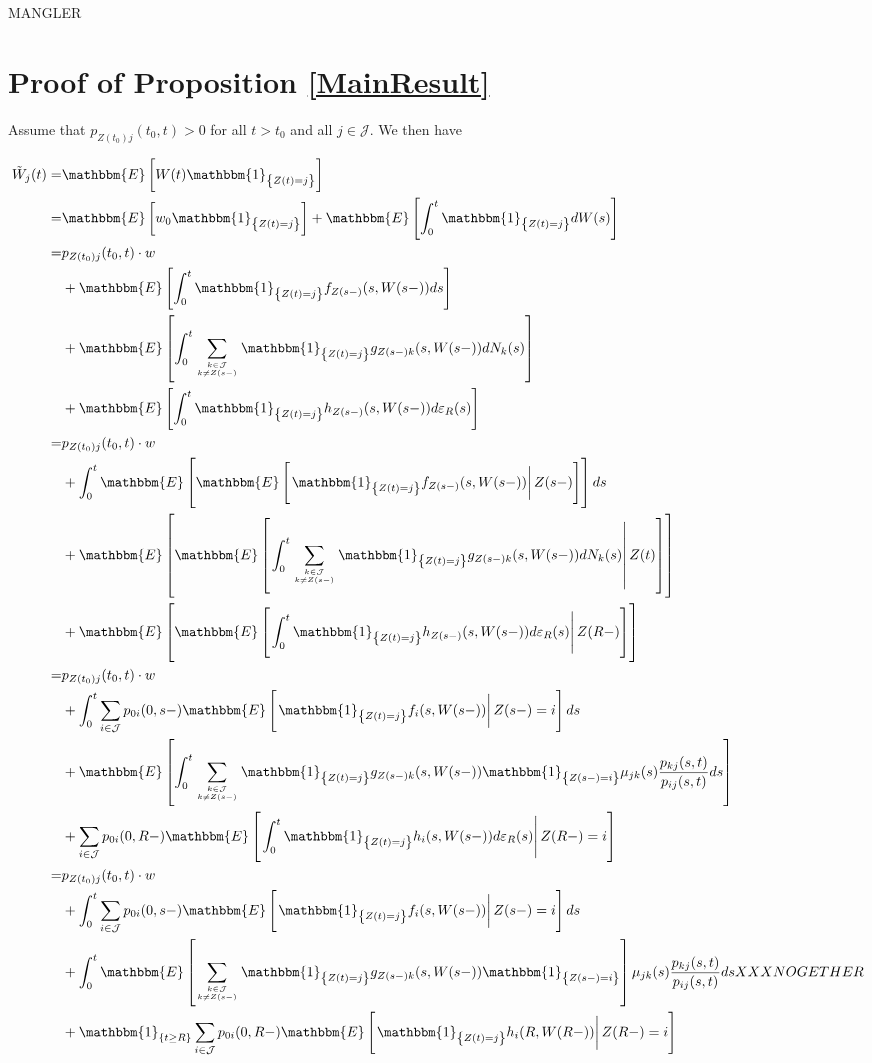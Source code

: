 \documentclass{book}
\newcommand{\1}[1]{\mathbbm{1}_{\left\lbrace #1 \right\rbrace}}
\newcommand{\expec}[1][def]{\mathbbm{E} \left[ #1 \right]}
\newcommand{\econd}[2][def]{\mathbbm{E} \left[ \left. #1 \right| #2 \right]}
\theoremstyle{break}
\theoremstyle{remark}
\numberwithin{equation}{section}
\begin{document}
MANGLER

\section{Proof of Proposition \ref{MainResult}} \label{MainProof}

Assume that $p_{Z(t_0)j}(t_0,t)>0$ for all $t>t_0$ and all $j \in \mathcal{J}$. We then have

\begin{align*}
    \tilde{W}_j(t) =& \expec[W(t) \1{Z(t)=j}] \\
    =& \expec[w_0 \1{Z(t)=j}] + \expec[\int_0^t \1{Z(t)=j} dW(s)] \\
    =& p_{Z(t_0)j}(t_0,t) \cdot w \\
    &+ \expec[\int_0^t \1{Z(t)=j} f_{Z(s-)}(s,W(s-)) ds] \\
    &+ \expec[\int_0^t \sum_{k \in \mathcal{J} \atop k \neq Z(s-)} \1{Z(t)=j} g_{Z(s-)k}(s,W(s-)) dN_k(s)] \\
    &+ \expec[\int_0^t \1{Z(t)=j} h_{Z(s-)}(s,W(s-)) d \varepsilon_{R}(s)] \\
    =& p_{Z(t_0)j}(t_0,t) \cdot w \\
    &+ \int_0^t \mathbbm{E} \left[ \econd[\1{Z(t)=j} f_{Z(s-)}(s,W(s-))]{Z(s-)} \right] ds \\
    &+ \mathbbm{E} \left[ \econd[ \int_0^t \sum_{k \in \mathcal{J} \atop k \neq Z(s-)} \1{Z(t)=j} g_{Z(s-)k}(s,W(s-)) dN_k(s)]{Z(t)} \right] \\
    &+ \mathbbm{E} \left[ \econd[\int_0^t \1{Z(t)=j} h_{Z(s-)}(s,W(s-)) d \varepsilon_{R}(s)]{Z(R-)} \right] \\
    =& p_{Z(t_0)j}(t_0,t) \cdot w \\
    &+ \int_0^t \sum_{i \in \mathcal{J}} p_{0i}(0,s-) \econd[\1{Z(t)=j} f_{i}(s,W(s-))]{Z(s-)=i} ds \\
    &+ \expec[ \int_0^t \sum_{k \in \mathcal{J} \atop k \neq Z(s-)} \1{Z(t)=j} g_{Z(s-)k}(s,W(s-)) \1{Z(s-)=i} \mu_{jk}(s) \frac{p_{kj}(s,t)}{p_{ij}(s,t)} ds] \\
    &+ \sum_{i \in \mathcal{J}} p_{0i}(0,R-) \econd[\int_0^t \1{Z(t)=j} h_{i}(s,W(s-)) d \varepsilon_{R}(s)]{Z(R-)=i} \\
    =& p_{Z(t_0)j}(t_0,t) \cdot w \\
    &+ \int_0^t \sum_{i \in \mathcal{J}} p_{0i}(0,s-) \econd[\1{Z(t)=j} f_{i}(s,W(s-))]{Z(s-)=i} ds \\
    &+ \int_0^t \expec[ \sum_{k \in \mathcal{J} \atop k \neq Z(s-)} \1{Z(t)=j} g_{Z(s-)k}(s,W(s-)) \1{Z(s-)=i}] \mu_{jk}(s) \frac{p_{kj}(s,t)}{p_{ij}(s,t)} ds XXX NOGETHER   \\
    &+ \1{t \geq R} \sum_{i \in \mathcal{J}} p_{0i}(0,R-) \econd[\1{Z(t)=j} h_{i}(R,W(R-))]{Z(R-)=i} \\
\end{align*}
\end{document}
